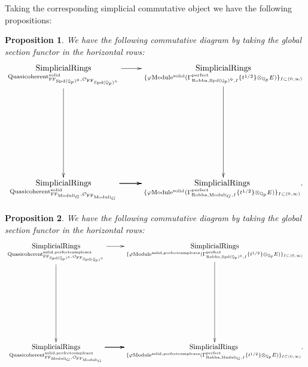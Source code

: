 \documentclass[12pt]{book}
\newtheorem{proposition}{Proposition}
\theoremstyle{definition}
\begin{document}
\indent Taking the corresponding simplicial commutative object we have the following propositions:

\begin{proposition}
We have the following commutative diagram by taking the global section functor in the horizontal rows:
\[\displayindent=+0in
\xymatrix@R+7pc{
\underset{\mathrm{Quasicoherent}^{\mathrm{solid}}_{\mathrm{FF}_{\mathrm{Spd}(\mathbb{Q}_p)^\diamond},\mathcal{O}_{\mathrm{FF}_{\mathrm{Spd}(\mathbb{Q}_p)^\diamond}}}}{\mathrm{SimplicialRings}} \ar[d] \ar[r] &\underset{\{\varphi\mathrm{Module}^{\mathrm{solid}}(\Gamma^\text{perfect}_{\text{Robba},{\mathrm{Spd}(\mathbb{Q}_p)^\diamond},I}\{t^{1/2}\}\otimes_{\mathbb{Q}_p}E)\}_{I\subset (0,\infty)}}{\mathrm{SimplicialRings}} \ar[d]\\
\underset{\mathrm{Quasicoherent}^{\mathrm{solid}}_{\mathrm{FF}_{\mathrm{Moduli}_G},\mathcal{O}_{\mathrm{FF}_{\mathrm{Moduli}_G}}}}{\mathrm{SimplicialRings}}  \ar[r] \ar[r] \ar[r] &\underset{\{\varphi\mathrm{Module}^{\mathrm{solid}}(\Gamma^\text{perfect}_{\text{Robba},{\mathrm{Moduli}_G},I}\{t^{1/2}\}\otimes_{\mathbb{Q}_p}E)\}_{I\subset (0,\infty)}}{\mathrm{SimplicialRings}}.
}
\]
\end{proposition}

\begin{proposition}
We have the following commutative diagram by taking the global section functor in the horizontal rows:
\[\displayindent=+0in
\xymatrix@C+0in@R+7pc{
\underset{\mathrm{Quasicoherent}^{\mathrm{solid,perfectcomplexes}}_{\mathrm{FF}_{\mathrm{Spd}(\mathbb{Q}_p)^\diamond},\mathcal{O}_{\mathrm{FF}_{\mathrm{Spd}(\mathbb{Q}_p)^\diamond}}}}{\mathrm{SimplicialRings}}\ar[d] \ar[r] &\underset{\{\varphi\mathrm{Module}^{\mathrm{solid,perfectcomplexes}}(\Gamma^\text{perfect}_{\text{Robba},{\mathrm{Spd}(\mathbb{Q}_p)^\diamond},I}\{t^{1/2}\}\otimes_{\mathbb{Q}_p}E)\}_{I\subset (0,\infty)}}{\mathrm{SimplicialRings}}\ar[d]\\
\underset{\mathrm{Quasicoherent}^{\mathrm{solid,perfectcomplexes}}_{\mathrm{FF}_{\mathrm{Moduli}_G},\mathcal{O}_{\mathrm{FF}_{\mathrm{Moduli}_G}}}}{\mathrm{SimplicialRings}}  \ar[r] \ar[r] \ar[r] &\underset{\{\varphi\mathrm{Module}^{\mathrm{solid,perfectcomplexes}}(\Gamma^\text{perfect}_{\text{Robba},{\mathrm{Moduli}_G},I}\{t^{1/2}\}\otimes_{\mathbb{Q}_p}E)\}_{I\subset (0,\infty)}}{\mathrm{SimplicialRings}}.  
}
\]
\end{proposition}
\end{document}
